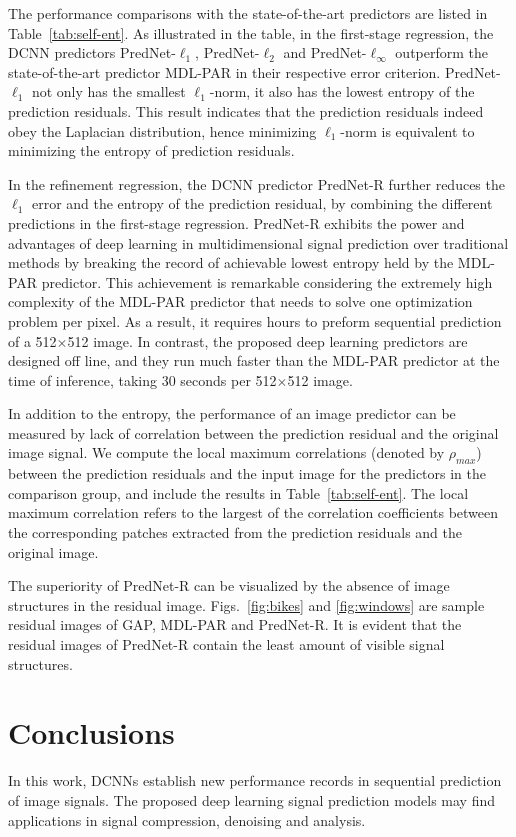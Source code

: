 \documentclass{article}
\begin{document}
The performance comparisons with the state-of-the-art predictors are listed in Table~\ref{tab:self-ent}.
As illustrated in the table, in the first-stage regression,  the DCNN predictors PredNet-$\ell_1$, PredNet-$\ell_2$ and PredNet-$\ell_\infty$ outperform the state-of-the-art predictor MDL-PAR in their respective error criterion.
PredNet-$\ell_1$ not only has the smallest $\ell_1$-norm, it also has the lowest entropy of the prediction residuals.  This result indicates that the prediction residuals indeed obey the Laplacian distribution, hence minimizing $\ell_1$-norm is equivalent to minimizing the entropy of prediction residuals.

In the refinement regression, the DCNN predictor PredNet-R further reduces the $\ell_1$ error and the entropy of the prediction residual, by combining the different predictions in the first-stage regression.  PredNet-R exhibits the power and advantages of deep learning in multidimensional signal prediction over traditional methods by breaking the record of achievable lowest entropy held by the MDL-PAR predictor.  This achievement is remarkable considering the extremely high complexity of the MDL-PAR predictor that needs to solve one optimization problem per pixel.  As a result, it requires hours to preform sequential prediction of a 512$\times$512 image.  In contrast, the proposed deep learning predictors are designed off line, and they run much faster than the MDL-PAR predictor at the time of inference, taking 30 seconds per 512$\times$512 image.

In addition to the entropy, the performance of an image predictor can be measured by lack of correlation between the prediction residual and the original image signal. We compute the local maximum correlations (denoted by $\rho_{max}$) between the prediction residuals and the input image for the predictors in the comparison group, and include the results in Table~\ref{tab:self-ent}.  
The local maximum correlation refers to the largest of the correlation coefficients between the corresponding patches extracted from the prediction residuals and the original image.

The superiority of PredNet-R can be visualized by the absence of image structures in the residual image.  Figs.~\ref{fig:bikes} and \ref{fig:windows} are sample residual images of GAP, MDL-PAR and PredNet-R. It is evident that the residual images of PredNet-R contain the least amount of visible signal structures.

\section{Conclusions}
In this work, DCNNs establish new performance records in sequential prediction of image signals.  The proposed deep learning signal prediction models may find applications in signal compression, denoising and analysis.




\end{document}
